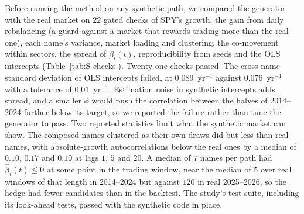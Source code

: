 Before running the method on any synthetic path, we compared the generator with the real market on $22$ gated
checks of SPY's growth, the gain from daily rebalancing (a guard against a market that rewards trading more than the
real one), each name's variance, market loading and clustering, the co-movement within sectors, the spread of
$\hat\beta_i(t)$, reproducibility from seeds and the OLS intercepts (Table~\ref{tab:S-checks}). Twenty-one checks
passed. The cross-name standard deviation of OLS intercepts failed, at $0.089$~yr$^{-1}$ against $0.076$~yr$^{-1}$
with a tolerance of $0.01$~yr$^{-1}$. Estimation noise in synthetic intercepts adds spread, and a smaller $\phi$
would push the correlation between the halves of 2014--2024 further below its target, so we reported the failure
rather than tune the generator to pass. Two reported statistics limit what the synthetic market can show. The
composed names clustered as their own draws did but less than real names, with absolute-growth autocorrelations below
the real ones by a median of $0.10$, $0.17$ and $0.10$ at lags $1$, $5$ and $20$. A median of $7$ names per path had
$\hat\beta_i(t) \le 0$ at some point in the trading window, near the median of $5$ over real windows of that length
in 2014--2024 but against $120$ in real 2025--2026, so the hedge had fewer candidates than in the backtest. The
study's test suite, including its look-ahead tests, passed with the synthetic code in place.

